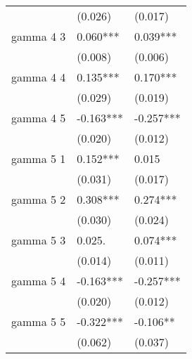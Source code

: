 \begin{tabular}{lll}
   & (0.026) & (0.017) \\ 
  gamma 4 3 & 0.060*** & 0.039*** \\ 
   & (0.008) & (0.006) \\ 
  gamma 4 4 & 0.135*** & 0.170*** \\ 
   & (0.029) & (0.019) \\ 
  gamma 4 5 & -0.163*** & -0.257*** \\ 
   & (0.020) & (0.012) \\ 
  gamma 5 1 & 0.152*** & 0.015 \\ 
   & (0.031) & (0.017) \\ 
  gamma 5 2 & 0.308*** & 0.274*** \\ 
   & (0.030) & (0.024) \\ 
  gamma 5 3 & 0.025. & 0.074*** \\ 
   & (0.014) & (0.011) \\ 
  gamma 5 4 & -0.163*** & -0.257*** \\ 
   & (0.020) & (0.012) \\ 
  gamma 5 5 & -0.322*** & -0.106** \\ 
   & (0.062) & (0.037) \\ 
   \hline
\end{tabular}
